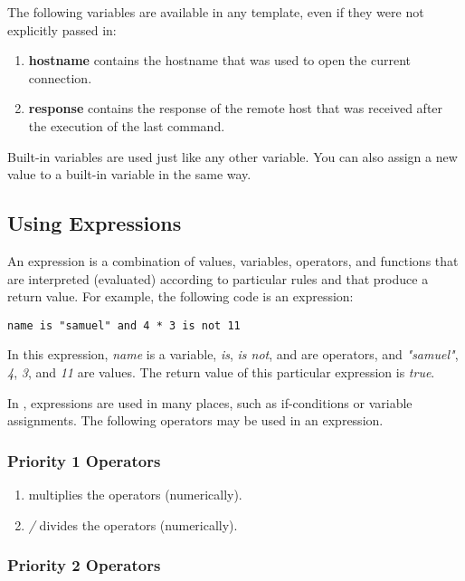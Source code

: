 The following variables are available in any \product template, even if 
they were not explicitly passed in:

\begin{enumerate}
\item {\bf hostname} contains the hostname that was used to open the 
current connection.
\item {\bf response} contains the response of the remote host that was 
received after the execution of the last command. 
\end{enumerate}

Built-in variables are used just like any other variable. You can also 
assign a new value to a built-in variable in the same way. 


\subsection{Using Expressions}

An expression is a combination of values, variables, operators, and functions 
that are interpreted (evaluated) according to particular rules and that 
produce a return value. For example, the following code is an expression:

\begin{lstlisting}
name is "samuel" and 4 * 3 is not 11
\end{lstlisting}

In this expression, {\it name} is a variable, {\it is}, {\it is not}, and 
{\it *} are operators, and {\it "samuel"}, {\it 4}, {\it 3}, and {\it 11} 
are values. The return value of this particular expression is {\it true}.

In \product, expressions are used in many places, such as if-conditions or 
variable assignments. The following operators may be used in an expression. 


\subsubsection{Priority 1 Operators}

\begin{enumerate}
\item {\it *} multiplies the operators (numerically).
\item {\it /} divides the operators (numerically).
\end{enumerate}


\subsubsection{Priority 2 Operators}

